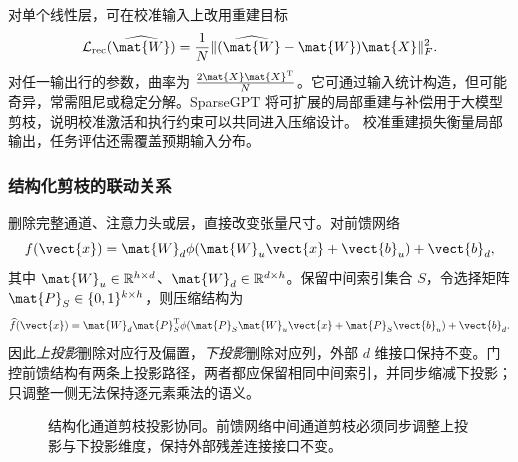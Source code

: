 \documentclass[../textbook.tex]{subfiles}
\begin{document}
对单个线性层，可在校准输入上改用重建目标
\begin{equation}
 \mathcal L_{\mathrm{rec}}(\widehat{\mat{W}})
 =\frac1N\|(\widehat{\mat{W}}-\mat{W})\mat{X}\|_F^2.
\end{equation}
对任一输出行的参数，曲率为 $\frac{2\mat{X}\mat{X}^{\mathrm{T}}}{N}$。它可通过输入统计构造，但可能奇异，常需阻尼或稳定分解。SparseGPT 将可扩展的局部重建与补偿用于大模型剪枝，说明校准激活和执行约束可以共同进入压缩设计。\cite{frantar2023sparsegpt} 校准重建损失衡量局部输出，任务评估还需覆盖预期输入分布。

\subsubsection{结构化剪枝的联动关系}
删除完整通道、注意力头或层，直接改变张量尺寸。对前馈网络
\begin{equation}
 f(\vect{x})=\mat{W}_d\phi(\mat{W}_u\vect{x}+\vect{b}_u)+\vect{b}_d,
\end{equation}
其中 $\mat{W}_u\in\mathbb R^{h\times d}$、$\mat{W}_d\in\mathbb R^{d\times h}$。保留中间索引集合 $S$，令选择矩阵 $\mat{P}_S\in\{0,1\}^{k\times h}$，则压缩结构为
\begin{equation}
 \widehat f(\vect{x})=\mat{W}_d\mat{P}_S^{\mathrm{T}}\phi(\mat{P}_S\mat{W}_u\vect{x}+\mat{P}_S\vect{b}_u)+\vect{b}_d.
\end{equation}
因此\emph{上投影}删除对应行及偏置，\emph{下投影}删除对应列，外部 $d$ 维接口保持不变。门控前馈结构有两条上投影路径，两者都应保留相同中间索引，并同步缩减下投影；只调整一侧无法保持逐元素乘法的语义。

\begin{figure}[htbp]
\centering
{}
\caption[结构化通道剪枝投影协同]{结构化通道剪枝投影协同。前馈网络中间通道剪枝必须同步调整上投影与下投影维度，保持外部残差连接接口不变。}\label{fig:compress-prune}
\end{figure}
\end{document}
